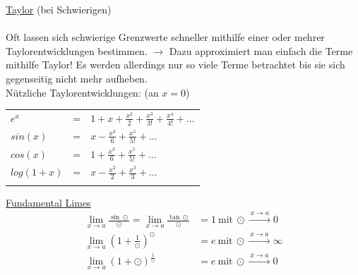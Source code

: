 \documentclass[6pt]{article}
\begin{document}
\begin{multicols*}{3}
   	
    \underline{Taylor}\hspace{35mm} (bei Schwierigen) \\
    	\vspace{-2mm} \\
   		Oft lassen sich schwierige Grenzwerte schneller mithilfe einer oder mehrer Taylorentwicklungen bestimmen.
   		$\rightarrow$ Dazu approximiert man einfach die Terme mithilfe Taylor! Es werden allerdings nur so viele Terme betrachtet bis sie sich gegenseitig nicht mehr aufheben.
		\vspace{4mm} \\
		N{\"u}tzliche Taylorentwicklungen: (an $x=0$)\\
			\begin{onehalfspace} 
				\begin{tabular}{lll}
						$e^x$ 			& =	& 	$1 + x  + \frac{x^2}{2} + \frac{x^3}{3!} +  \frac{x^4}{4!} + ...$ \\
						 $sin(x)$ 		& =	&	$x - \frac{x^3}{6} + \frac{x^5}{5!} + ... $ \\
						 $cos(x)$ 		& = 	& 	$1 + \frac{x^3}{6} + \frac{x^5}{5!} + ...$ \\
						 $log(1+x)$	& =	&  $x - \frac{x^2}{2} + \frac{x^3}{3} + ...$ \\
						 \vspace{-2mm}\\
				\end{tabular}
			\end{onehalfspace}
		
   \underline{Fundamental Limes}\\
   \vspace{-5mm}
   	\begin{equation*}
		\begin{split}
			\lim_{x \to a} \frac{\sin \odot}{\odot} = \lim_{x \to a} \frac{\tan \odot}{\odot} & = 1\ \text{mit}\ \odot \xrightarrow{\: x \to a \: } 0 \\ 
			\lim_{x \to a} (1 + \frac{1}{\odot})^\odot & = e\ \text{mit}\ \odot \xrightarrow{\: x \to a \: } \infty \\ 
			\lim_{x \to a} (1 + \odot)^\frac{1}{\odot} & = e\ \text{mit}\ \odot \xrightarrow{\: x \to a \: } 0 \\ 
		\end{split}
	\end{equation*}
	\vspace{-4mm}\\
   

\end{multicols*}
\end{document}
